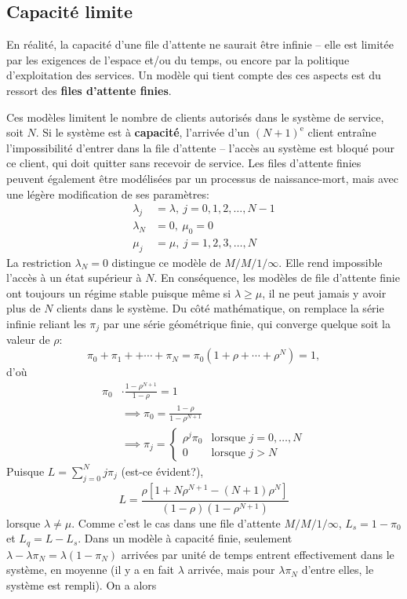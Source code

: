 \subsection{Capacité limite}
En réalité, la capacité d'une file d'attente ne saurait \^etre infinie -- elle est limitée par les exigences de l'{espace} et/ou du {temps}, ou encore par la politique d'exploitation des services. Un modèle qui tient compte des ces aspects est du ressort des \textbf{files d'attente finies}. \par Ces modèles limitent le nombre de clients autorisés dans le système de service, soit $N$. Si le système est à \textbf{capacité}, l'arrivée d'un $(N+1)^{\textrm{e}}$ client entraîne l'impossibilité d'entrer dans la file d'attente -- l'accès au système est bloqué pour ce client, qui doit quitter sans recevoir de service. \newl Les files d'attente finies peuvent également être modélisées par un processus de naissance-mort, mais avec une légère modification de ses paramètres:  \begin{align*}
\lambda_{j} &= \lambda, \ j=0,1,2,\ldots,N-1 \\ 
\lambda_{N} &= 0,\ \mu_{0} = 0 \\
\mu_{j} &= \mu,\  j=1,2,3,\ldots, N 
\end{align*}
La restriction $\lambda_{N} = 0$ distingue ce modèle de $M/M/1/\infty$. Elle rend impossible l'accès à un état supérieur à $N$. En conséquence, les modèles de file d'attente finie ont toujours un régime stable puisque même si $\lambda \geq \mu$, il ne peut jamais y avoir plus de $N$ clients dans le système.
\newl Du c\^oté mathématique, on remplace la série infinie reliant les $\pi_j$ par une série géométrique finie, qui converge quelque soit la valeur de $\rho$: 
$$ \pi_{0}+\pi_1 + +\cdots + \pi_N = \pi_0(1+\rho+\cdots +\rho^{N}) = 1,$$ \noindent d'où \begin{align*}\pi_{0}&\cdot \frac{1-\rho^{N+1}}{1-\rho} = 1 \\ &\implies \pi_0 = \frac{1-\rho}{1-\rho^{N+1}} \\ &\implies \pi_{j} = \begin{cases}\rho^{j} \pi_0 & \text{lorsque $j=0,\ldots,N$} \\ 0 & \text{lorsque $j>N$}\end{cases}\end{align*}
Puisque $L = \sum^{N}_{j=0} j \pi_{j}$ (est-ce évident?), 
$$L = \frac{\rho [1+ N \rho^{N+1} - (N+1) \rho^{N} ]}{(1-\rho)\left(1-\rho^{N+1}\right)} $$
lorsque $\lambda\neq\mu$. Comme c'est le cas dans une file d'attente  $M/M/1/\infty$, $L_{s} = 1 - \pi_{0}$ et $L_{q} = L - L_{s}$.  \newl Dans un modèle à capacité finie, seulement $\lambda - \lambda \pi_{N} = \lambda\left(1-\pi_{N}\right)$ arrivées par unité de temps entrent effectivement dans le système, en moyenne (il y a en fait $\lambda$ arrivée, mais pour $\lambda\pi_N$ d'entre elles, le système est rempli). On a alors 
